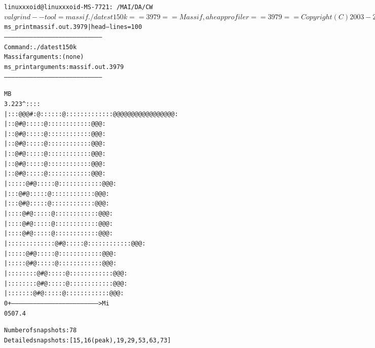 \begin{alltt}
linuxxxoid@linuxxxoid-MS-7721:~/MAI/DA/CW$ valgrind --tool=massif ./da test150k
==3979== Massif, a heap profiler
==3979== Copyright (C) 2003-2017, and GNU GPL'd, by Nicholas Nethercote
==3979== Using Valgrind-3.13.0 and LibVEX; rerun with -h for copyright info
==3979== Command: ./da test150k
==3979==
==3979==
linuxxxoid@linuxxxoid-MS-7721:~/MAI/DA/CW$ ms_print massif.out.3979 | head --lines=100
--------------------------------------------------------------------------------
Command:            ./da test150k
Massif arguments:   (none)
ms_print arguments: massif.out.3979
--------------------------------------------------------------------------------


    MB
3.223^                                ::::
     |                   :   ::@@@#:@::   ::::@:::::::::::::@@@@@@@@@@@@@@@@@:
     |                   :   : @  # @::   : ::@: :::::::::::@@@              :
     |                   :   : @  # @::   : ::@: :::::::::::@@@              :
     |                   :   : @  # @::   : ::@: :::::::::::@@@              :
     |                   :   : @  # @::   : ::@: :::::::::::@@@              :
     |                   :   : @  # @::   : ::@: :::::::::::@@@              :
     |                   :   : @  # @::   : ::@: :::::::::::@@@              :
     |                   ::::: @  # @::   : ::@: :::::::::::@@@              :
     |                   :  :: @  # @::   : ::@: :::::::::::@@@              :
     |                   :  :: @  # @::   : ::@: :::::::::::@@@              :
     |         :         :  :: @  # @::   : ::@: :::::::::::@@@              :
     |         :         :  :: @  # @::   : ::@: :::::::::::@@@              :
     |         :         :  :: @  # @::   : ::@: :::::::::::@@@              :
     |         :::::::::::  :: @  # @::   : ::@: :::::::::::@@@              :
     |     :   :         :  :: @  # @::   : ::@: :::::::::::@@@              :
     |     :   :         :  :: @  # @::   : ::@: :::::::::::@@@              :
     |     :::::         :  :: @  # @::   : ::@: :::::::::::@@@              :
     |  ::::   :         :  :: @  # @::   : ::@: :::::::::::@@@              :
     | ::  :   :         :  :: @  # @::   : ::@: :::::::::::@@@              :
   0 +----------------------------------------------------------------------->Mi
     0                                                                   507.4

Number of snapshots: 78
 Detailed snapshots: [15, 16 (peak), 19, 29, 53, 63, 73]


\end{alltt}
